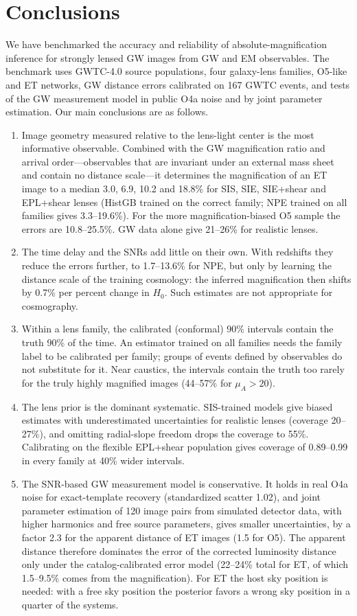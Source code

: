 \section{Conclusions}
\label{sec:conclusions}
We have benchmarked the accuracy and reliability of absolute-magnification inference for strongly lensed GW images from GW and EM observables. The benchmark uses GWTC-4.0 source populations, four galaxy-lens families, O5-like and ET networks, GW distance errors calibrated on 167 GWTC events, and tests of the GW measurement model in public O4a noise and by joint parameter estimation. Our main conclusions are as follows.
\begin{enumerate}
\item Image geometry measured relative to the lens-light center is the most informative observable. Combined with the GW magnification ratio and arrival order---observables that are invariant under an external mass sheet and contain no distance scale---it determines the magnification of an ET image to a median 3.0, 6.9, 10.2 and 18.8\% for SIS, SIE, SIE+shear and EPL+shear lenses (HistGB trained on the correct family; NPE trained on all families gives 3.3--19.6\%). For the more magnification-biased O5 sample the errors are 10.8--25.5\%. GW data alone give 21--26\% for realistic lenses.
\item The time delay and the SNRs add little on their own. With redshifts they reduce the errors further, to 1.7--13.6\% for NPE, but only by learning the distance scale of the training cosmology: the inferred magnification then shifts by 0.7\% per percent change in $H_0$. Such estimates are not appropriate for cosmography.
\item Within a lens family, the calibrated (conformal) 90\% intervals contain the truth 90\% of the time. An estimator trained on all families needs the family label to be calibrated per family; groups of events defined by observables do not substitute for it. Near caustics, the intervals contain the truth too rarely for the truly highly magnified images (44--57\% for $\mu_A>20$).
\item The lens prior is the dominant systematic. SIS-trained models give biased estimates with underestimated uncertainties for realistic lenses (coverage 20--27\%), and omitting radial-slope freedom drops the coverage to 55\%. Calibrating on the flexible EPL+shear population gives coverage of 0.89--0.99 in every family at 40\% wider intervals.
\item The SNR-based GW measurement model is conservative. It holds in real O4a noise for exact-template recovery (standardized scatter 1.02), and joint parameter estimation of 120 image pairs from simulated detector data, with higher harmonics and free source parameters, gives smaller uncertainties, by a factor 2.3 for the apparent distance of ET images (1.5 for O5). The apparent distance therefore dominates the error of the corrected luminosity distance only under the catalog-calibrated error model (22--24\% total for ET, of which 1.5--9.5\% comes from the magnification). For ET the host sky position is needed: with a free sky position the posterior favors a wrong sky position in a quarter of the systems.

\end{enumerate}
